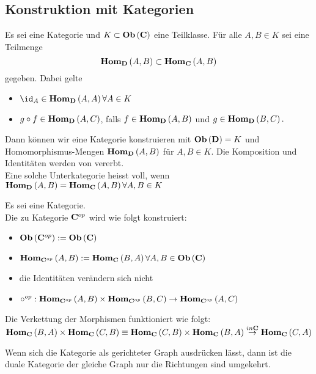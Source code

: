 \documentclass{article}
\begin{document}
\begin{bsp}[Fundamentalgruppoid]
\section{Konstruktion mit Kategorien}

\begin{defi}[Unterkategorie] {\cite[Definition 2.6.1]{Bra}} 
Es sei \CatC eine Kategorie und \( K \subset  \mathbf{Ob} \left(\mathbf{C}\right) \) eine Teilklasse. F\"ur alle \( A,B \in K \) sei eine Teilmenge
\[
	 \mathbf{Hom } _\mathbf{D} \left( A, B \right) \subset  \mathbf{Hom } _\mathbf{C} \left( A, B \right)
\]
gegeben. Dabei gelte
\begin{itemize}
	\item \( \id_A \in \Hom_\CatD \left( A, A \right) \forall A \in K \)
	\item \( g \circ f \in   \mathbf{Hom } _\mathbf{D} \left( A,C \right) \), falls \( f \in  \mathbf{Hom } _\mathbf{D} \left( A, B \right) \) und  \( g \in  \mathbf{Hom } _\mathbf{D} \left( B , C \right) .\)
\end{itemize}
Dann k\"onnen wir eine Kategorie \CatD konstruieren mit \(  \mathbf{Ob}  \left( \mathbf{D} \right) = K \) und Homomorphismus-Mengen \(  \mathbf{Hom } _\mathbf{D} \left(A,B \right) \) f\"ur \( A,B \in K \). Die Komposition und Identit\"aten werden von \CatC vererbt.
\\
Eine solche Unterkategorie heisst voll, wenn \(  \mathbf{Hom } _\mathbf{D} \left( A,B \right) =  \mathbf{Hom } _\mathbf{C} \left(A,B \right) \forall A,B \in K \)
 
\begin{defi} \cite[Definition 2.6.3]{Bra} 
	Es sei \CatC eine Kategorie.  \\
	Die zu Kategorie \( \mathbf{C}^{op} \) wird wie folgt konstruiert:
	\begin{itemize}
		\item \(  \mathbf{Ob}  \left( \mathbf{C}^{op} \right) :=  \mathbf{Ob}  \left( \mathbf{C} \right) \)
		\item \(  \mathbf{Hom } _{\mathbf{C}^{op}} \left( A,B \right) :=  \mathbf{Hom } _\mathbf{C} \left( B,A \right) \forall A,B \in  \mathbf{Ob}  \left( \mathbf{C} \right) \)
		\item  die Identit\"aten ver\"andern sich nicht
		\item \( \circ^{op}:      \mathbf{Hom } _{\mathbf{C}^{op}} \left( A,B \right) \times   \mathbf{Hom } _{\mathbf{C}^{op}} \left( B,C \right) \to   \mathbf{Hom } _{\mathbf{C}^{op}} \left( A,C \right) \)
	\end{itemize}
	Die Verkettung der Morphismen funktioniert wie folgt: \\
	\(  \mathbf{Hom } _\mathbf{C} \left(B,A \right) \times  \mathbf{Hom } _\mathbf{C} \left(C,B \right) \equiv  \mathbf{Hom } _\mathbf{C} \left(C,B \right) \times  \mathbf{Hom } _\mathbf{C} \left(B,A \right) \overset{in \mathbf{C}}{\to}  \mathbf{Hom } _\mathbf{C} \left(C,A \right) \)
\end{defi}
	Wenn sich die Kategorie als gerichteter Graph ausdr\"ucken l\"asst, dann ist die duale Kategorie der gleiche Graph nur die Richtungen sind umgekehrt.
	

\end{defi}
\end{bsp}
\end{document}
